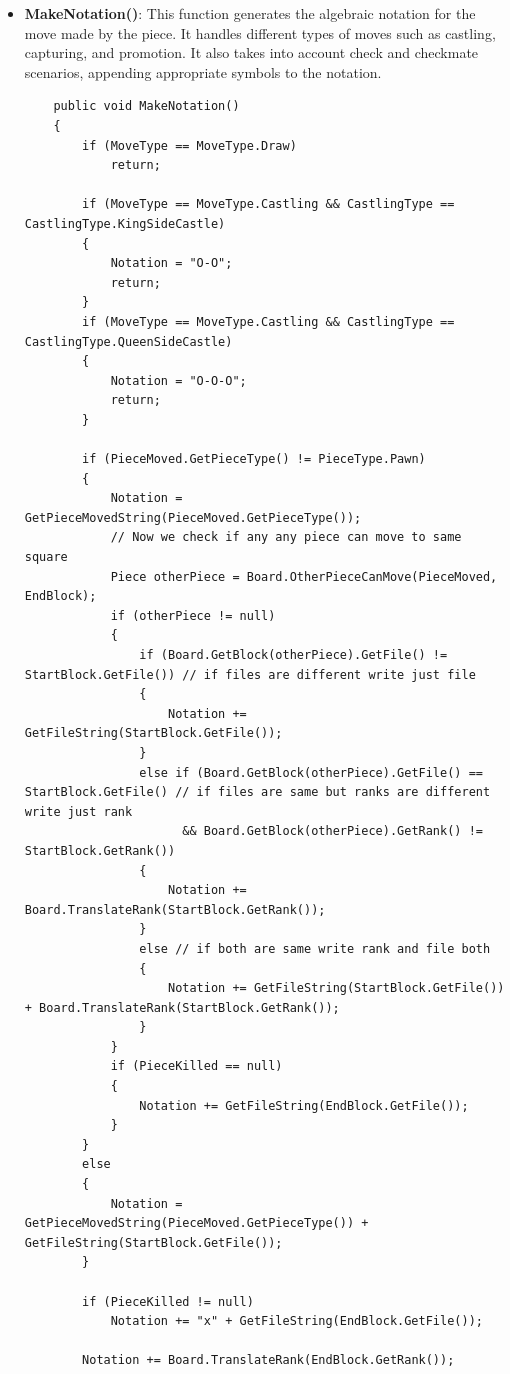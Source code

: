 \documentclass[a4paper,12pt]{article}
\begin{document}
\begin{itemize}
    \item \textbf{MakeNotation()}: 
    This function generates the algebraic notation for the move made by the piece. It handles different types of moves such as castling, capturing, and promotion. It also takes into account check and checkmate scenarios, appending appropriate symbols to the notation.

    \begin{verbatim}
    public void MakeNotation()
    {
        if (MoveType == MoveType.Draw)
            return;

        if (MoveType == MoveType.Castling && CastlingType == CastlingType.KingSideCastle)
        {
            Notation = "O-O";
            return;
        }
        if (MoveType == MoveType.Castling && CastlingType == CastlingType.QueenSideCastle)
        {
            Notation = "O-O-O";
            return;
        }

        if (PieceMoved.GetPieceType() != PieceType.Pawn)
        {
            Notation = GetPieceMovedString(PieceMoved.GetPieceType());
            // Now we check if any any piece can move to same square
            Piece otherPiece = Board.OtherPieceCanMove(PieceMoved, EndBlock);
            if (otherPiece != null)
            {
                if (Board.GetBlock(otherPiece).GetFile() != StartBlock.GetFile()) // if files are different write just file
                {
                    Notation += GetFileString(StartBlock.GetFile());
                }
                else if (Board.GetBlock(otherPiece).GetFile() == StartBlock.GetFile() // if files are same but ranks are different write just rank
                      && Board.GetBlock(otherPiece).GetRank() != StartBlock.GetRank())
                {
                    Notation += Board.TranslateRank(StartBlock.GetRank());
                }
                else // if both are same write rank and file both
                {
                    Notation += GetFileString(StartBlock.GetFile()) + Board.TranslateRank(StartBlock.GetRank());
                }
            }
            if (PieceKilled == null)
            {
                Notation += GetFileString(EndBlock.GetFile());
            }
        }
        else
        {
            Notation = GetPieceMovedString(PieceMoved.GetPieceType()) + GetFileString(StartBlock.GetFile());
        }

        if (PieceKilled != null)
            Notation += "x" + GetFileString(EndBlock.GetFile());

        Notation += Board.TranslateRank(EndBlock.GetRank());


\end{verbatim}
\end{itemize}
\end{document}
